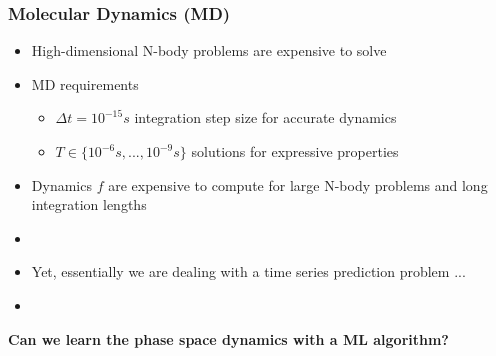 \documentclass[usenames, dvipsnames, t]{beamer}
\begin{document}
\begin{frame}
	\frametitle{Molecular Dynamics (MD)}
	\begin{itemize}
		\item<+-> High-dimensional N-body problems are expensive to solve
		\item<+-> MD requirements 
		\begin{itemize}
			\item $\Delta t = 10^{-15} s$ integration step size for accurate dynamics
			\item $T \in \{ 10^{-6} s, ...,  10^{-9} s \}$ solutions for expressive properties
		\end{itemize}
		\item<+-> Dynamics $f$ are expensive to compute for large N-body problems and long integration lengths
		\item[] 
		\item<+-> Yet, essentially we are dealing with a time series prediction problem ...
		\item[] 
	\end{itemize}
	\onslide<+->
		\begin{center}
		\textbf{Can we learn the phase space dynamics with a ML algorithm?}
		\end{center}
\end{frame}
\end{document}
